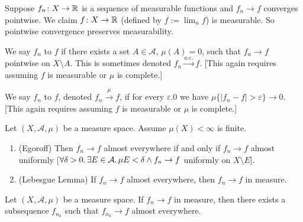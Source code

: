 \begin{node}
Suppose $f_{n}\colon X\to\mathbb{R}$ is a sequence of measurable functions
and $f_{n}\to f$ converges pointwise. We claim $f\colon X\to\mathbb{R}$
(defined by $f:=\lim_{n}f$) is measurable. So pointwise convergence
preserves measurability.
\end{node}

\begin{definition}
We say $f_{n}$  to $f$ if there
exists a set $A\in\mathcal{A}$, $\mu(A)=0$, such that $f_{n}\to f$
pointwise on $X\setminus A$.
This is sometimes denoted $f_{n}\xrightarrow{a.e.}f$.
[This again requires assuming $f$ is measurable or $\mu$ is complete.]
\end{definition}

\begin{definition}
We say $f_{n}$  to $f$, denoted
$f_{n}\xrightarrow{\mu}f$, if for every $\varepsilon.0$ we have $\mu\{|f_{n}-f|>\varepsilon\}\to0$.
[This again requires assuming $f$ is measurable or $\mu$ is complete.]
\end{definition}

\begin{theorem}
Let $(X,\mathcal{A},\mu)$ be a measure space. Assume $\mu(X)<\infty$
is finite.
\begin{enumerate}
\item (Egoroff) Then $f_{n}\to f$ almost everywhere if and only if
  $f_{n}\to f$ almost uniformly [$\forall\delta>0\ldotp\exists E\in\mathcal{A}\ldotp\mu E<\delta\land f_{n}\to f$ uniformly on $X\setminus E$].
\item (Lebesgue Lemma) If $f_{n}\to f$ almost everywhere, then
  $f_{n}\to f$ in measure.
\end{enumerate}
\end{theorem}

\begin{theorem}[Riesz]
Let $(X,\mathcal{A},\mu)$ be a measure space. If $f_{n}\to f$ in
measure, then there exists a subsequence $f_{n_{k}}$ such that $f_{n_{k}}\to f$ almost everywhere.
\end{theorem}